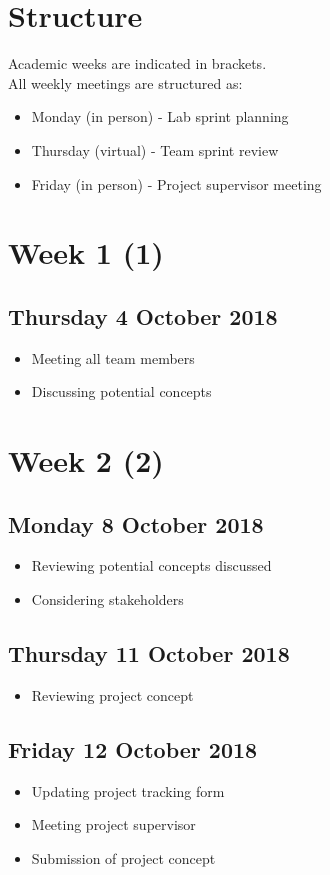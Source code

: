 \section*{Structure}
Academic weeks are indicated in brackets.\\

All weekly meetings are structured as:
\begin{itemize}
	\item Monday (in person) - Lab sprint planning
	\item Thursday (virtual) - Team sprint review
	\item Friday (in person) - Project supervisor meeting
\end{itemize}

\section*{Week 1 (1)}
\subsection*{Thursday 4 October 2018}
\begin{itemize}
	\item Meeting all team members
	\item Discussing potential concepts
\end{itemize}

\section*{Week 2 (2)}
\subsection*{Monday 8 October 2018}
\begin{itemize}
	\item Reviewing potential concepts discussed
    \item Considering stakeholders
\end{itemize}

\subsection*{Thursday 11 October 2018}
\begin{itemize}
	\item Reviewing project concept
\end{itemize}

\subsection*{Friday 12 October 2018}
\begin{itemize}
    \item Updating project tracking form
	\item Meeting project supervisor
	\item Submission of project concept
\end{itemize}

